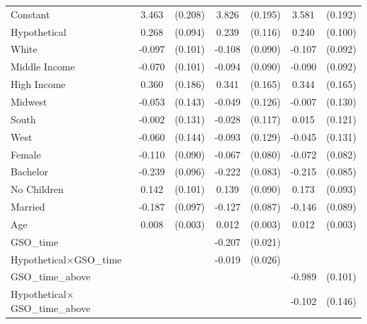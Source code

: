 \documentclass[12pt]{article}
\newcommand{\sym}[1]{\rlap{$^{#1}$}}
\begin{document}
\begin{table}[H]
{\begin{tabular}{l*{3}{cc}}
Constant    &       3.463\sym{***}&     (0.208)&       3.826\sym{***}&     (0.195)&       3.581\sym{***}&     (0.192)\\
Hypothetical&       0.268\sym{***}&     (0.094)&       0.239\sym{**} &     (0.116)&       0.240\sym{**} &     (0.100)\\
White       &      -0.097         &     (0.101)&      -0.108         &     (0.090)&      -0.107         &     (0.092)\\
Middle Income&      -0.070         &     (0.101)&      -0.094         &     (0.090)&      -0.090         &     (0.092)\\
High Income &       0.360\sym{*}  &     (0.186)&       0.341\sym{**} &     (0.165)&       0.344\sym{**} &     (0.165)\\
Midwest     &      -0.053         &     (0.143)&      -0.049         &     (0.126)&      -0.007         &     (0.130)\\
South       &      -0.002         &     (0.131)&      -0.028         &     (0.117)&       0.015         &     (0.121)\\
West        &      -0.060         &     (0.144)&      -0.093         &     (0.129)&      -0.045         &     (0.131)\\
Female      &      -0.110         &     (0.090)&      -0.067         &     (0.080)&      -0.072         &     (0.082)\\
Bachelor    &      -0.239\sym{**} &     (0.096)&      -0.222\sym{***}&     (0.083)&      -0.215\sym{**} &     (0.085)\\
No Children &       0.142         &     (0.101)&       0.139         &     (0.090)&       0.173\sym{*}  &     (0.093)\\
Married     &      -0.187\sym{*}  &     (0.097)&      -0.127         &     (0.087)&      -0.146         &     (0.089)\\
Age         &       0.008\sym{**} &     (0.003)&       0.012\sym{***}&     (0.003)&       0.012\sym{***}&     (0.003)\\
GSO\_time    &                     &            &      -0.207\sym{***}&     (0.021)&                     &            \\
Hypothetical$\times$GSO\_time&                     &            &      -0.019         &     (0.026)&                     &            \\
GSO\_time\_above&                     &            &                     &            &      -0.989\sym{***}&     (0.101)\\
Hypothetical$\times$GSO\_time\_above&                     &            &                     &            &      -0.102         &     (0.146)\\

\end{tabular}}
\end{table}
\end{document}
